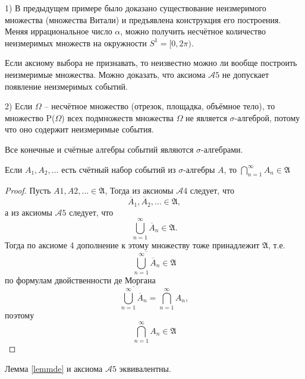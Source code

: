 \begin{zam}
1) В предыдущем примере было доказано существование неизмеримого множества (множества Витали) и предъявлена конструкция его построения. Меняя иррациональное число $\alpha$, можно получить несчётное количество неизмеримых множеств на окружности $S^1 = [0, 2\pi)$. 

Если аксиому выбора не признавать, то неизвестно можно ли вообще построить неизмеримые множества. Можно доказать, что аксиома $\mathcal{A}5$ не допускает появление неизмеримых событий.

2) Если $\Omega$ -- несчётное множество (отрезок, площадка, объёмное тело), то множество P($\Omega$) всех подмножеств множества $\Omega$ не является $\sigma$-алгеброй, потому что оно содержит неизмеримые события.
\end{zam}

\begin{zam}
Все конечные и счётные алгебры событий являются $\sigma$-алгебрами.
\end{zam}

\begin{lemma}\label{lemmde}
Если ${A_1 , A_2 , \ldots }$ есть счётный набор событий из $\sigma$-алгебры $A$, то $\bigcap\limits_{n=1}^\infty A_n\in\mathfrak{A}$
\end{lemma}

\begin{proof}
Пусть $A1 , A2 , \ldots \in \mathfrak{A}$, Тогда из аксиомы $\mathcal{A}4$ следует, что
	\begin{equation*}
		\overline{A}_1,\overline{A}_2, \ldots \in \mathfrak{A},
	\end{equation*}
а из аксиомы $\mathcal{A}5$ следует, что
	\begin{equation*}
		\bigcup\limits_{n=1}^\infty \overline{A}_n\in\mathfrak{A}.
	\end{equation*} 
Тогда по аксиоме 4 дополнение к этому множеству тоже принадлежит $\mathfrak{A}$, т.е. 
	\begin{equation*}
		\overline{\bigcup\limits_{n=1}^\infty \overline{A}_n}\in\mathfrak{A}
	\end{equation*}
по формулам двойственности де Моргана
	\begin{equation*}
		\overline{\bigcup\limits_{n=1}^\infty \overline{A}_n}=\bigcap\limits_{n=1}^\infty {A}_n,
	\end{equation*} 
поэтому
	\begin{equation*}
		\bigcap\limits_{n=1}^\infty {A}_n\in\mathfrak{A}
	\end{equation*}

\end{proof}

\begin{consq}
	Лемма \ref{lemmde} и аксиома $\mathcal{A}5$ эквивалентны.
\end{consq}